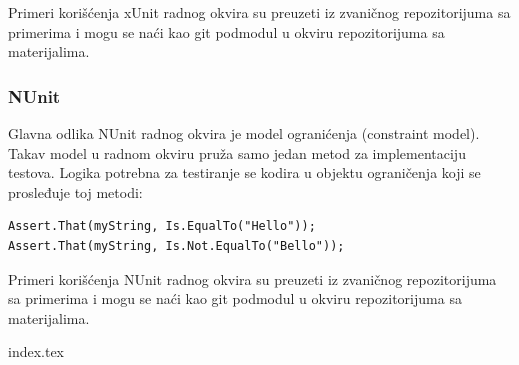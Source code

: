 Primeri korišćenja xUnit radnog okvira su preuzeti iz zvaničnog repozitorijuma sa primerima i mogu se naći kao git podmodul u okviru repozitorijuma sa materijalima.

\subsubsection{NUnit}\label{nunit}

Glavna odlika NUnit radnog okvira je model ogranićenja (constraint model). Takav model u radnom okviru pruža samo jedan metod za implementaciju testova. Logika potrebna za testiranje se kodira u objektu ograničenja koji se prosleđuje toj metodi:

\begin{verbatim}
Assert.That(myString, Is.EqualTo("Hello"));
Assert.That(myString, Is.Not.EqualTo("Bello"));
\end{verbatim}

Primeri korišćenja NUnit radnog okvira su preuzeti iz zvaničnog repozitorijuma sa primerima i mogu se naći kao git podmodul u okviru repozitorijuma sa materijalima.

{index.tex}

